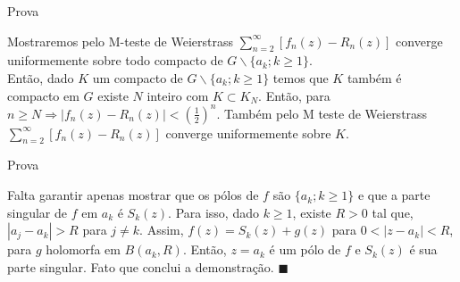 \documentclass{libs/ufc_format}
\begin{document}
\begin{frame}{Prova}
\begin{prova}
Mostraremos pelo M-teste de Weierstrass $\displaystyle \sum_{n=2}^{\infty}\left[f_n\left(z\right) - R_n\left(z\right)\right]$ converge uniformemente sobre todo compacto de $G\backslash \{a_{k}; k\geq 1\}$.\\
\pause
Então, dado $K$ um compacto de $G\backslash \{a_{k}; k\geq 1\}$ \pause temos que $K$ também é compacto em $G$  existe $N$ inteiro com $K\subset K_{N}$. Então, para $n\geq N \Rightarrow |f_n\left(z\right) - R_n\left(z\right)|< \left(\frac{1}{2}\right)^{n}$. \pause Também pelo M teste de Weierstrass $\sum_{n=2}^{\infty}\left[f_n\left(z\right) - R_n\left(z\right)\right]$ converge uniformemente sobre $K$. \\

\end{prova}
\end{frame}

\begin{frame}{Prova}
\begin{prova}
Falta garantir apenas mostrar que os pólos de $f$ são $\{a_{k}; k\geq 1\}$ e que a parte singular de $f$ em $a_{k}$ é $S_{k}(z)$. \pause Para isso, dado $k\geq 1$, existe $R>0$ tal que, $|a_{j}-a_{k}|>R$ para $j\neq k$. \pause Assim, $f(z) = S_{k}(z)+g(z)$ para $0<|z-a_{k}|<R$, para $g$ holomorfa em $B\left(a_{k}, R\right)$. \pause Então, $z=a_{k}$ é um pólo de $f$ e $S_{k}(z)$ é sua parte singular. Fato que conclui a demonstração. $\blacksquare$
\end{prova}
\end{frame}
\end{document}
